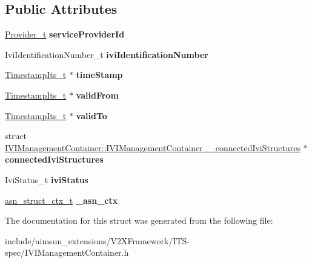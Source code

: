 \subsection*{Public Attributes}
\begin{DoxyCompactItemize}
\item 
\hyperlink{structProvider}{Provider\+\_\+t} {\bfseries service\+Provider\+Id}\hypertarget{structIVIManagementContainer_a10746b2e2bce6abe34e45d9c3b569806}{}\label{structIVIManagementContainer_a10746b2e2bce6abe34e45d9c3b569806}

\item 
Ivi\+Identification\+Number\+\_\+t {\bfseries ivi\+Identification\+Number}\hypertarget{structIVIManagementContainer_aad1a9b7f1ff8ba96e7a4d8c5e9a81af6}{}\label{structIVIManagementContainer_aad1a9b7f1ff8ba96e7a4d8c5e9a81af6}

\item 
\hyperlink{structASN____PRIMITIVE__TYPE__s}{Timestamp\+Its\+\_\+t} $\ast$ {\bfseries time\+Stamp}\hypertarget{structIVIManagementContainer_a3b6ce41e2ffcde6ac6635d2f184c2d26}{}\label{structIVIManagementContainer_a3b6ce41e2ffcde6ac6635d2f184c2d26}

\item 
\hyperlink{structASN____PRIMITIVE__TYPE__s}{Timestamp\+Its\+\_\+t} $\ast$ {\bfseries valid\+From}\hypertarget{structIVIManagementContainer_afdeedb7a4cbd4aa31d4c43f73eb31a21}{}\label{structIVIManagementContainer_afdeedb7a4cbd4aa31d4c43f73eb31a21}

\item 
\hyperlink{structASN____PRIMITIVE__TYPE__s}{Timestamp\+Its\+\_\+t} $\ast$ {\bfseries valid\+To}\hypertarget{structIVIManagementContainer_a5960efcaaee855d892d70de9f4d73180}{}\label{structIVIManagementContainer_a5960efcaaee855d892d70de9f4d73180}

\item 
struct \hyperlink{structIVIManagementContainer_1_1IVIManagementContainer____connectedIviStructures}{I\+V\+I\+Management\+Container\+::\+I\+V\+I\+Management\+Container\+\_\+\+\_\+connected\+Ivi\+Structures} $\ast$ {\bfseries connected\+Ivi\+Structures}\hypertarget{structIVIManagementContainer_a9c4c761fc31a5cf8efbac0b53e13258d}{}\label{structIVIManagementContainer_a9c4c761fc31a5cf8efbac0b53e13258d}

\item 
Ivi\+Status\+\_\+t {\bfseries ivi\+Status}\hypertarget{structIVIManagementContainer_acd4a8c0fab310c6d5cdd1ebcbb62434d}{}\label{structIVIManagementContainer_acd4a8c0fab310c6d5cdd1ebcbb62434d}

\item 
\hyperlink{structasn__struct__ctx__s}{asn\+\_\+struct\+\_\+ctx\+\_\+t} {\bfseries \+\_\+asn\+\_\+ctx}\hypertarget{structIVIManagementContainer_a5ccc0b8034b9c174391e6ba4129199a0}{}\label{structIVIManagementContainer_a5ccc0b8034b9c174391e6ba4129199a0}

\end{DoxyCompactItemize}


The documentation for this struct was generated from the following file\+:\begin{DoxyCompactItemize}
\item 
include/aimsun\+\_\+extensions/\+V2\+X\+Framework/\+I\+T\+S-\/spec/I\+V\+I\+Management\+Container.\+h\end{DoxyCompactItemize}
